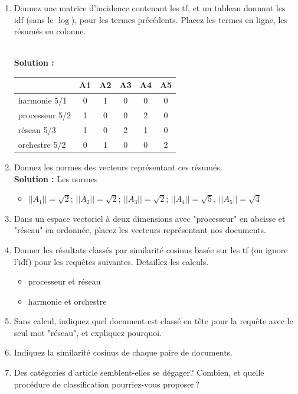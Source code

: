 \documentclass[11pt,a4paper]{article}
\newenvironment{solution}[0]{
~\\ \color{red} \textbf{Solution : }\color{black}}{%
}
\begin{document}
\begin{enumerate}
   \item Donnez une matrice d'incidence contenant les tf,
      et un tableau donnant les idf (sans le $\log$), pour les  termes précédents. Placez
      les termes en ligne, les résumés en colonne.

\begin{solution}
\begin{center}
\begin{tabular}{l|c|c|c|c|c}
            & \textbf{A1} & \textbf{A2} & \textbf{A3} &\textbf{A4}&\textbf{A5} \\ \hline
   harmonie 5/1   & 0           & 1           & 0          & 0         & 0\\
   processeur  5/2  & 1           & 0           & 0           & 2        & 0\\
   réseau  5/3  & 1           & 0           & 2          & 1         & 0\\
   orchestre 5/2  & 0           & 1           & 0           & 0        & 2\\\hline
   \end{tabular}
\end{center}
\end{solution}

  \item Donnez les normes des vecteurs représentant ces résumés.
\begin{solution}
Les normes
\begin{itemize}
  \item $||A_1|| = \sqrt{2}$; $||A_2|| = \sqrt{2}$; $||A_3|| = \sqrt{2}$;
    $||A_4|| = \sqrt{5}$, $||A_5|| = \sqrt{4}$
\end{itemize}
\end{solution}

  \item Dans un espace vectoriel à deux dimensions avec "processeur" en abcisse
  et "réseau" en ordonnée, placez les vecteurs représentant nos documents.

  \item Donner les résultats classés par similarité cosinus basée sur les tf
  (on ignore l'idf) pour les requêtes suivantes. Detaillez les calculs.

  \begin{itemize}
    \item processeur et réseau
    \item harmonie et orchestre
  \end{itemize}
\item Sans calcul, indiquez quel document est classé en tête pour la requête
    avec le seul mot "réseau", et expliquez pourquoi.

 \item Indiquez la similarité cosinus de chaque paire de documents.

 \item Des catégories d'article semblent-elles se dégager? Combien, et quelle
 procédure de classification pourriez-vous proposer\,?
\end{enumerate}
\end{document}
